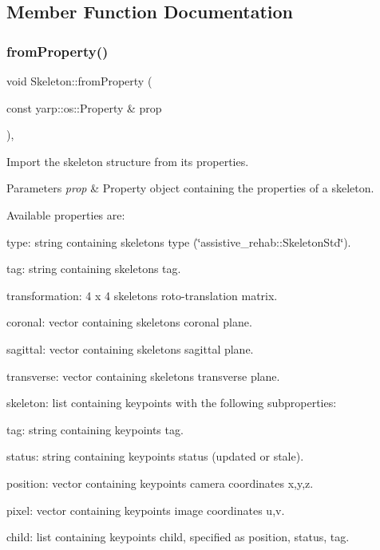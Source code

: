 \subsection{Member Function Documentation}
\mbox{\label{classassistive__rehab_1_1Skeleton_ac844f66503de87859833056dc33a835b}} 
\subsubsection{\texorpdfstring{from\+Property()}{fromProperty()}}
{\footnotesize\ttfamily void Skeleton\+::from\+Property (\begin{DoxyParamCaption}\item[{const yarp\+::os\+::\+Property \&}]{prop }\end{DoxyParamCaption})\hspace{0.3cm}{\ttfamily [virtual]}, {\ttfamily [inherited]}}



Import the skeleton structure from its properties. 


\begin{DoxyParams}{Parameters}
{\em prop} & Property object containing the properties of a skeleton.\\
\hline
\end{DoxyParams}
Available properties are\+:
\begin{DoxyItemize}
\item type\+: string containing skeleton\textquotesingle{}s type (\char`\"{}assistive\+\_\+rehab\+::\+Skeleton\+Std\char`\"{}).
\item tag\+: string containing skeleton\textquotesingle{}s tag.
\item transformation\+: 4 x 4 skeleton\textquotesingle{}s roto-\/translation matrix.
\item coronal\+: vector containing skeleton\textquotesingle{}s coronal plane.
\item sagittal\+: vector containing skeleton\textquotesingle{}s sagittal plane.
\item transverse\+: vector containing skeleton\textquotesingle{}s transverse plane.
\item skeleton\+: list containing keypoints with the following subproperties\+:
\begin{DoxyItemize}
\item tag\+: string containing keypoint\textquotesingle{}s tag.
\item status\+: string containing keypoint\textquotesingle{}s status (updated or stale).
\item position\+: vector containing keypoint\textquotesingle{}s camera coordinates x,y,z.
\item pixel\+: vector containing keypoint\textquotesingle{}s image coordinates u,v.
\item child\+: list containing keypoint\textquotesingle{}s child, specified as position, status, tag. 
\end{DoxyItemize}
\end{DoxyItemize}

